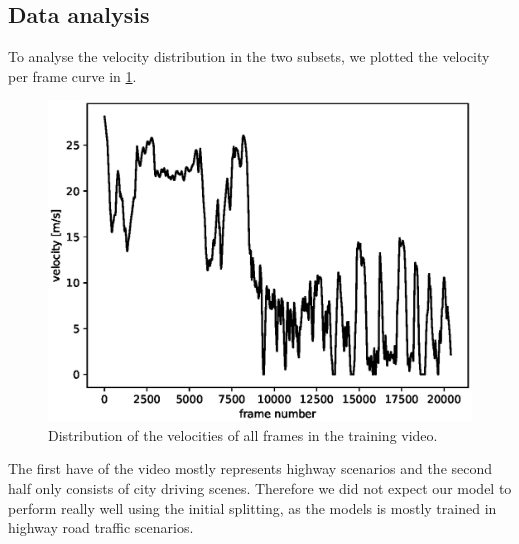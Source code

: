 \documentclass[conference]{IEEEtran}
\begin{document}
\subsection{Data analysis}
To analyse the velocity distribution in the two subsets, we plotted the velocity per frame curve in 
\cref{fig:SpeedPerFrameDistribution}.

\begin{figure}
\centering
\includegraphics[scale=0.6]{./imgs/plot_speed_time.eps}
\caption{Distribution of the velocities of all frames in the training video.}
\label{fig:SpeedPerFrameDistribution}
\end{figure}

The first have of the video mostly represents highway scenarios and the second half only consists of city driving scenes. 
Therefore we did not expect our model to perform really well using the initial splitting, as the models is mostly trained in highway 
road traffic scenarios.
\end{document}
